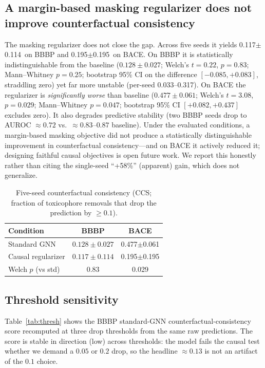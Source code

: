 \documentclass[journal]{IEEEtran}
\newcommand{\Fcausalreg}{0.117} \newcommand{\Fcausalregsd}{0.114} %
\newcommand{\BACEcausalstd}{0.477} \newcommand{\BACEcausalstdsd}{0.061} %
\newcommand{\BACEcausalreg}{0.195} \newcommand{\BACEcausalregsd}{0.195} %
\begin{document}
\subsection{A margin-based masking regularizer does not improve counterfactual consistency}
\label{sec:reg}
The masking regularizer does not close the gap. Across five seeds it yields
\Fcausalreg$\pm$\Fcausalregsd\ on BBBP and \BACEcausalreg$\pm$\BACEcausalregsd\ on
BACE. On BBBP it is statistically indistinguishable from the baseline
($0.128\pm0.027$; Welch's $t=0.22$, $p=0.83$; Mann--Whitney $p=0.25$; bootstrap
95\% CI on the difference $[-0.085, +0.083]$, straddling zero) yet far more
unstable (per-seed 0.033--0.317). On BACE the regularizer is \emph{significantly
worse} than baseline ($0.477\pm0.061$; Welch's $t=3.08$, $p=0.029$; Mann--Whitney
$p=0.047$; bootstrap 95\% CI $[+0.082, +0.437]$ excludes zero). It also degrades
predictive stability (two BBBP seeds drop to AUROC $\approx 0.72$ vs.\ 
$\approx 0.83$--$0.87$ baseline). Under the evaluated conditions, a
margin-based masking objective did not produce a statistically distinguishable
improvement in counterfactual consistency---and on BACE it actively reduced it;
designing faithful causal objectives is open future work. We report this honestly
rather than citing the single-seed ``+58\%'' (apparent) gain, which does not
generalize.

\begin{table}[t]
\centering
\caption{Five-seed counterfactual consistency (CCS; fraction of toxicophore
removals that drop the prediction by $\geq 0.1$).}
\label{tab:faith}
\begin{tabular}{lcc}
\toprule
Condition & BBBP & BACE \\
\midrule
Standard GNN & $0.128\pm0.027$ & \BACEcausalstd$\pm$\BACEcausalstdsd \\
Causal regularizer & $0.117\pm0.114$ & \BACEcausalreg$\pm$\BACEcausalregsd \\
\midrule
Welch $p$ (vs std) & 0.83 & 0.029 \\
\bottomrule
\end{tabular}
\end{table}

\subsection{Threshold sensitivity}
Table~\ref{tab:thresh} shows the BBBP standard-GNN counterfactual-consistency score recomputed at three
drop thresholds from the same raw predictions. The score is stable in direction
(low) across thresholds: the model fails the causal test whether we demand a
$0.05$ or $0.2$ drop, so the headline $\approx 0.13$ is not an artifact of the
$0.1$ choice.
\end{document}
